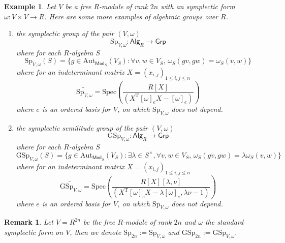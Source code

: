 \documentclass[10pt]{book}
\theoremstyle{bookplain}
\theoremstyle{bookdefinition}
\newtheorem{example}[theorem]{Example}
\theoremstyle{bookremark}
\newtheorem{remark}[theorem]{Remark}
\begin{document}
\begin{example}Let $V$ be a free $R$-module of rank $2n$ with an symplectic form $\omega:V\times V\rightarrow R$. Here are some more examples of algebraic groups over $R$.
    \begin{enumerate}
        \item the \textit{symplectic group} of the pair $(V,\omega)$
        \[\mathrm{Sp}_{V,\omega}:\mathsf{Alg}_R\rightarrow \mathsf{Grp} \]
        where for each $R$-algebra $S$ 
        \[\mathrm{Sp}_{V,\omega}(S)=\{g\in \mathrm{Aut}_{\mathsf{Mod}_S}(V_S):\forall v,w\in V_S,\,\omega_S(gv,gw)=\omega_S(v,w)\}\]
        where for an indeterminant matrix $X=(x_{i,j})_{1\le i,j\le n}$ 
        \[\widetilde{\mathrm{Sp}_{V,\omega}}=\mathrm{Spec}\left(\frac{R[X]}{(X^\mathrm{T}[\omega]_eX-[\omega]_e)}\right)\] where $e$ is an ordered basis for $V$, on which $\mathrm{Sp}_{V,\omega}$ does not depend. 
        \item the \textit{symplectic semilitude group} of the pair $(V,\omega)$
        \[\mathrm{GSp}_{V,\omega}:\mathsf{Alg}_R\rightarrow \mathsf{Grp} \]
        where for each $R$-algebra $S$ 
        \[\mathrm{GSp}_{V,\omega}(S)=\{g\in \mathrm{Aut}_{\mathsf{Mod}_S}(V_S):\exists \lambda\in S^\times,\forall v,w\in V_S,\,\omega_S(gv,gw)=\lambda \omega_S(v,w)\}\]
        where for an indeterminant matrix $X=(x_{i,j})_{1\le i,j\le n}$ 
        \[\widetilde{\mathrm{GSp}_{V,\omega}}=\mathrm{Spec}\left(\frac{R[X][\lambda,\nu]}{(X^\mathrm{T}[\omega]_eX-\lambda[\omega]_e,\lambda\nu-1)}\right)\] 
        where $e$ is an ordered basis for $V$, on which $\mathrm{Sp}_{V,\omega}$ does not depend. 
    \end{enumerate}
\end{example}
\begin{remark}Let $V=R^{2n}$ be the free $R$-module of rank $2n$ and $\omega$ the standard symplectic form on $V$, then we denote $\mathrm{Sp}_{2n}:=\mathrm{Sp}_{V,\omega}$ and $\mathrm{GSp}_{2n}:=\mathrm{GSp}_{V,\omega}$.
\end{remark}
\end{document}
